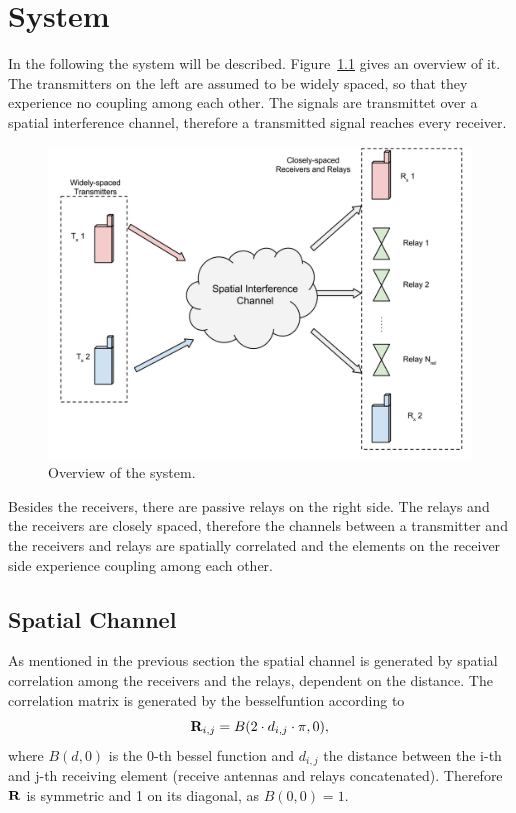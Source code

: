 \chapter{System}
\label{sec:system}

In the following the system will be described.
Figure~\ref{fig:system} gives an overview of it.
The transmitters on the left are assumed to be widely spaced, so that they experience no coupling among each other.
The signals are transmittet over a spatial interference channel, therefore a transmitted signal reaches every receiver.
\begin{figure}[h]
\begin{center}
\includegraphics[width=\textwidth]{images/System.png}
\caption{Overview of the system.}
\label{fig:system}
\end{center}
\end{figure}

Besides the receivers, there are passive relays on the right side.
The relays and the receivers are closely spaced, therefore the channels between a transmitter and the receivers and relays are spatially correlated and the elements on the receiver side experience coupling among each other.

\section{Spatial Channel}
\label{sec:spatial}

As mentioned in the previous section the spatial channel is generated by spatial correlation among the receivers and the relays, dependent on the distance.
The correlation matrix is generated by the besselfuntion according to
\begin{equation}
\label{eq:spatial_corr}
\mathbf{R}_{i,j} = B(2\cdot d_{i,j}\cdot \pi,0),
\end{equation}
where $B(d,0)$ is the 0-th bessel function and $d_{i,j}$ the distance between the i-th and j-th receiving element (receive antennas and relays concatenated).
Therefore $\mathbf{R}$ is symmetric and 1 on its diagonal, as $B(0,0)=1$.


